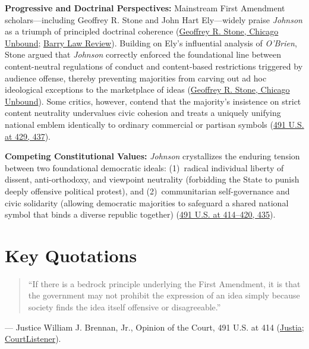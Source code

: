 \documentclass[12pt]{article}
\begin{document}
\textbf{Progressive and Doctrinal Perspectives:} Mainstream First Amendment scholars---including Geoffrey R. Stone and John Hart Ely---widely praise \textit{Johnson} as a triumph of principled doctrinal coherence (\href{https://chicagounbound.uchicago.edu/cgi/viewcontent.cgi?article=1010&context=occasional_papers}{Geoffrey R. Stone, Chicago Unbound}; \href{https://lawpublications.barry.edu/cgi/viewcontent.cgi?article=1063&context=barrylrev}{Barry Law Review}). Building on Ely's influential analysis of \textit{O'Brien}, Stone argued that \textit{Johnson} correctly enforced the foundational line between content-neutral regulations of conduct and content-based restrictions triggered by audience offense, thereby preventing majorities from carving out ad hoc ideological exceptions to the marketplace of ideas (\href{https://chicagounbound.uchicago.edu/cgi/viewcontent.cgi?article=1010&context=occasional_papers}{Geoffrey R. Stone, Chicago Unbound}). Some critics, however, contend that the majority's insistence on strict content neutrality undervalues civic cohesion and treats a uniquely unifying national emblem identically to ordinary commercial or partisan symbols (\href{https://supreme.justia.com/cases/federal/us/491/397/}{491 U.S. at 429, 437}).

\textbf{Competing Constitutional Values:} \textit{Johnson} crystallizes the enduring tension between two foundational democratic ideals: (1)~radical individual liberty of dissent, anti-orthodoxy, and viewpoint neutrality (forbidding the State to punish deeply offensive political protest), and (2)~communitarian self-governance and civic solidarity (allowing democratic majorities to safeguard a shared national symbol that binds a diverse republic together) (\href{https://supreme.justia.com/cases/federal/us/491/397/}{491 U.S. at 414--420, 435}).

\section{Key Quotations}
\begin{quote}
``If there is a bedrock principle underlying the First Amendment, it is that the government may not prohibit the expression of an idea simply because society finds the idea itself offensive or disagreeable.''
\end{quote}
\noindent --- Justice William J. Brennan, Jr., Opinion of the Court, 491 U.S. at 414 (\href{https://supreme.justia.com/cases/federal/us/491/397/}{Justia}; \href{https://www.courtlistener.com/opinion/112304/texas-v-johnson/}{CourtListener}).
\end{document}
